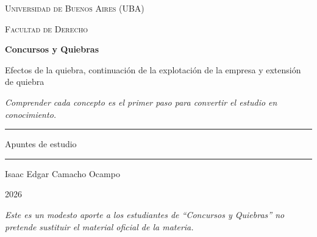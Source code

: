\documentclass[12pt,oneside]{book}
\newcommand{\universidad}{Universidad de Buenos Aires (UBA)}
\newcommand{\facultad}{Facultad de Derecho}
\newcommand{\materia}{Concursos y Quiebras}
\newcommand{\titulo}{Efectos de la quiebra, continuación de la explotación de la empresa y extensión de quiebra}
\newcommand{\autor}{Isaac Edgar Camacho Ocampo}
\newcommand{\anio}{2026}
\begin{document}
\begin{titlepage}

\thispagestyle{empty}

\begin{center}

\vspace*{1cm}

{\large \textsc{\universidad}}

\vspace{0.2cm}

{\large \textsc{\facultad}}

\vspace{3cm}

{\Huge \textbf{\materia}}

\vspace{1cm}

{\LARGE \titulo}

\vspace{0.8cm}

\textit{Comprender cada concepto es el primer paso para convertir el estudio en conocimiento.}

\vspace{1.2cm}

\rule{0.70\textwidth}{0.5pt}

\vspace{0.5cm}

{\large Apuntes de estudio}

\vspace{0.5cm}

\rule{0.70\textwidth}{0.5pt}

\vfill

{\large \autor}

\vspace{0.3cm}

{\large \anio}

\end{center}

\vfill

\begin{flushleft}
\textit{Este es un modesto aporte a los estudiantes de ``\materia'' no pretende sustituir el material oficial de la materia.}
\end{flushleft}

\end{titlepage}

\frontmatter
\tableofcontents
\mainmatter
\end{document}
